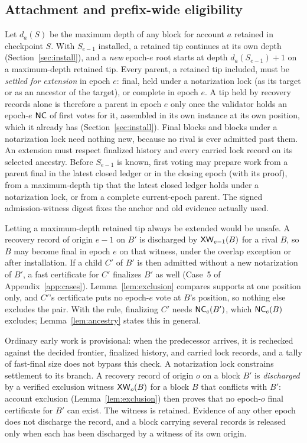 \subsection{Attachment and prefix-wide eligibility}
\label{sec:eligibility}
Let $d_a(S)$ be the maximum depth of any block for account $a$ retained in checkpoint $S$. With $S_{e-1}$ installed, a retained tip continues at its own depth (Section~\ref{sec:install}), and a \emph{new} epoch-$e$ root starts at depth $d_a(S_{e-1})+1$ on a maximum-depth retained tip. Every parent, a retained tip included, must be \emph{settled for extension} in epoch $e$: final, held under a notarization lock (as its target or as an ancestor of the target), or complete in epoch $e$. A tip held by recovery records alone is therefore a parent in epoch $e$ only once the validator holds an epoch-$e$ $\mathsf{NC}$ of first votes for it, assembled in its own instance at its own position, which it already has (Section~\ref{sec:install}). Final blocks and blocks under a notarization lock need nothing new, because no rival is ever admitted past them. An extension must respect finalized history and every carried lock record on its selected ancestry. Before $S_{e-1}$ is known, first voting may prepare work from a parent final in the latest closed ledger or in the closing epoch (with its proof), from a maximum-depth tip that the latest closed ledger holds under a notarization lock, or from a complete current-epoch parent. The signed admission-witness digest fixes the anchor and old evidence actually used.

Letting a maximum-depth retained tip always be extended would be unsafe. A recovery record of origin $e-1$ on $B'$ is discharged by $\mathsf{XW}_{e-1}(B)$ for a rival $B$, so $B$ may become final in epoch $e$ on that witness, under the overlap exception or after installation. If a child $C'$ of $B'$ is then admitted without a new notarization of $B'$, a fast certificate for $C'$ finalizes $B'$ as well (Case~5 of Appendix~\ref{app:cases}). Lemma~\ref{lem:exclusion} compares supports at one position only, and $C'$'s certificate puts no epoch-$e$ vote at $B$'s position, so nothing else excludes the pair. With the rule, finalizing $C'$ needs $\mathsf{NC}_e(B')$, which $\mathsf{NC}_e(B)$ excludes; Lemma~\ref{lem:ancestry} states this in general.

Ordinary early work is provisional: when the predecessor arrives, it is rechecked against the decided frontier, finalized history, and carried lock records, and a tally of fast-final size does not bypass this check. A notarization lock constrains settlement to its branch. A recovery record of origin $o$ on a block $B'$ is \emph{discharged} by a verified exclusion witness $\mathsf{XW}_o(B)$ for a block $B$ that conflicts with $B'$: account exclusion (Lemma~\ref{lem:exclusion}) then proves that no epoch-$o$ final certificate for $B'$ can exist. The witness is retained. Evidence of any other epoch does not discharge the record, and a block carrying several records is released only when each has been discharged by a witness of its own origin.

